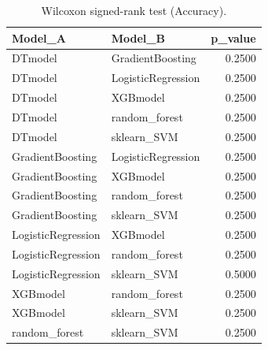 \begin{table}[t]
\centering
\begin{tabular}{llr}
\toprule
Model_A & Model_B & p_value \\
\midrule
DTmodel & GradientBoosting & 0.2500 \\
DTmodel & LogisticRegression & 0.2500 \\
DTmodel & XGBmodel & 0.2500 \\
DTmodel & random_forest & 0.2500 \\
DTmodel & sklearn_SVM & 0.2500 \\
GradientBoosting & LogisticRegression & 0.2500 \\
GradientBoosting & XGBmodel & 0.2500 \\
GradientBoosting & random_forest & 0.2500 \\
GradientBoosting & sklearn_SVM & 0.2500 \\
LogisticRegression & XGBmodel & 0.2500 \\
LogisticRegression & random_forest & 0.2500 \\
LogisticRegression & sklearn_SVM & 0.5000 \\
XGBmodel & random_forest & 0.2500 \\
XGBmodel & sklearn_SVM & 0.2500 \\
random_forest & sklearn_SVM & 0.2500 \\
\bottomrule
\end{tabular}
\caption{Wilcoxon signed-rank test (Accuracy).}
\label{tab:wilcoxon_Accuracy}
\end{table}